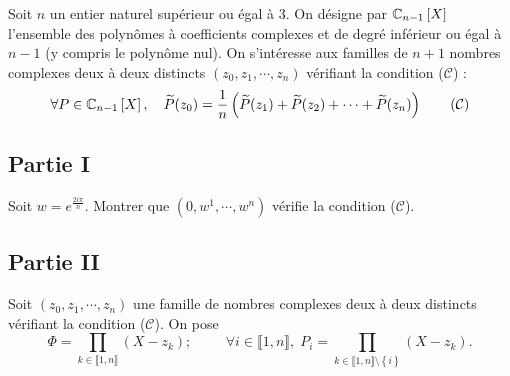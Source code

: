 Soit $n$ un entier naturel sup\'{e}rieur ou \'{e}gal \`{a} 3. On désigne par $\mathbb{C}_{n-1}\left[ X\right] $ l'ensemble des polyn\^{o}mes \`{a} coefficients complexes et de degr\'{e} inf\'{e}rieur ou \'{e}gal \`{a} $n-1$ (y compris le polyn\^{o}me nul).\newline
On s'int\'{e}resse aux familles de $n+1$ nombres complexes deux \`{a} deux distincts $(z_{0},z_{1},\cdots ,z_{n})$ v\'{e}rifiant la condition ($\mathcal{C}$) :
\begin{equation}
\forall P\in \C_{n-1}\left[ X\right] ,\quad \widetilde{P}(z_{0})=\frac{1}{n}\left( \widetilde{P}(z_{1})+\widetilde{P}(z_{2})+\cdots +\widetilde{P}(z_{n})\right)  \tag{$\mathcal{C}$}
\end{equation}

\subsection*{Partie I}

Soit $w = e^{\frac{2i\pi}{n}}$. Montrer que $(0, w^{1},\cdots , w^{n})$ v\'{e}rifie la condition ($\mathcal{C}$).

\subsection*{Partie II}

Soit $(z_{0},z_{1},\cdots, z_{n})$ une famille de nombres complexes deux \`{a} deux distincts v\'{e}rifiant la condition ($\mathcal{C}$). On pose 
\[
\Phi = \prod_{k\in \llbracket 1,n \rrbracket }(X-z_{k}); \hspace{1cm}
\forall i \in \llbracket 1,n \rrbracket, \; 
P_{i} = 
\prod_{k\in \llbracket 1,n \rrbracket \setminus \left\lbrace  i \right\rbrace  }(X-z_{k}).
\]

